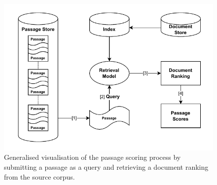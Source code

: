 \begin{figure}[t]
    \centering
    \includegraphics[width=\textwidth]{./graphics/drawio/passage_scoring.pdf}
    \caption{Generalised visualisation of the passage scoring process by submitting a passage as a query and retrieving a document ranking from the source corpus.}
    \label{fig:passage-scoring}
\end{figure}

